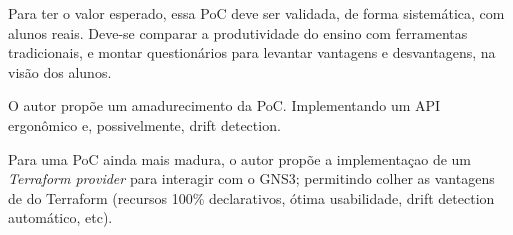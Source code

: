 \documentclass[12pt]{article}
\begin{document}
Para ter o valor esperado, essa PoC deve ser validada, de forma sistemática,
com alunos reais. Deve-se comparar a produtividade do ensino com ferramentas
tradicionais, e montar questionários para levantar vantagens e desvantagens, na
visão dos alunos.

O autor propõe um amadurecimento da PoC. Implementando um API ergonômico e,
possivelmente, drift detection.

Para uma PoC ainda mais madura, o autor propõe a implementaçao de um
\textit{Terraform provider} para interagir com o GNS3; permitindo colher as
vantagens de do Terraform (recursos 100\% declarativos, ótima usabilidade,
drift detection automático, etc).



\end{document}
